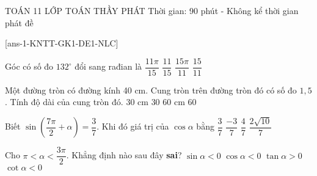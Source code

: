 \begin{name}
	{\tenchude}
	{TOÁN 11}
	{LỚP TOÁN THẦY PHÁT}
	{Thời gian: 90 phút - Không kể thời gian phát đề}
\end{name}

\caulc

[ans-1-KNTT-GK1-DE1-NLC]
\begin{ex}%
Góc có số đo $132^{\circ}$ đổi sang rađian là
\choice
	{\True $\dfrac{11\pi}{15}$}
	{$\dfrac{11}{15}$}
	{$\dfrac{15\pi}{11}$}
	{$\dfrac{15}{11}$}
\end{ex}

\begin{ex}%
	Một đường tròn có đường kính 40 cm. Cung tròn trên đường tròn đó có số đo $1{,}5$. Tính độ dài của cung tròn đó.
	\choice
	{\True $30$ cm}
	{$30$}
	{$60$ cm}
	{$60$}
	\end{ex}
	
	\begin{ex}%
		Biết $\sin \left(\dfrac{7\pi}{2}+\alpha\right)=\dfrac{3}{7}$. Khi đó giá trị của $\cos \alpha$ bằng
		\choice
		{$\dfrac{3}{7}$}
		{\True $\dfrac{-3}{7}$}
		{$\dfrac{4}{7}$}
		{$\dfrac{2\sqrt{10}}{7}$}
	\end{ex}
	
	\begin{ex}%
		Cho $\pi < \alpha < \dfrac{3\pi}{2}$. Khẳng định nào sau đây \textbf{sai}?
		\choice
		{$\sin \alpha < 0$}
		{$\cos \alpha < 0$}
		{$\tan \alpha > 0$}
		{\True $\cot \alpha < 0$}
	\end{ex}
	
